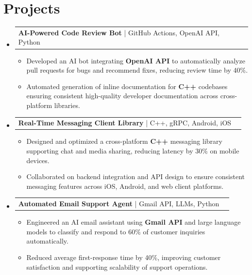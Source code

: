 \documentclass[letterpaper,11pt]{article}
\makeatletter
\newcommand{\resumeItem}[1]{
  \item\footnotesize{
    {#1 \vspace{-2pt}}
  }
}
\newcommand{\resumeProjectHeading}[2]{
    \item
    \begin{tabular*}{1.001\textwidth}{l@{\extracolsep{\fill}}r}
      \small#1 & \textbf{\small #2}\\
    \end{tabular*}\vspace{-7pt}
}
\newcommand{\resumeSubHeadingListStart}{\begin{itemize}[leftmargin=0pt, label={}]}
\newcommand{\resumeSubHeadingListEnd}{\end{itemize}}
\newcommand{\resumeItemListStart}{\begin{itemize}[leftmargin=*]}
\newcommand{\resumeItemListEnd}{\end{itemize}\vspace{-5pt}}
\makeatother
\begin{document}
\section{Projects}
    \vspace{-5pt}
    \resumeSubHeadingListStart
      \resumeProjectHeading
          {\textbf{AI-Powered Code Review Bot} | GitHub Actions, OpenAI API, Python}{}
          \resumeItemListStart
              \resumeItem{Developed an AI bot integrating \textbf{OpenAI API} to automatically analyze pull requests for bugs and recommend fixes, reducing review time by 40\%.}
              \resumeItem{Automated generation of inline documentation for \textbf{C++} codebases ensuring consistent high-quality developer documentation across cross-platform libraries.}
          \resumeItemListEnd
          \vspace{-12pt}
      \resumeProjectHeading
          {\textbf{Real-Time Messaging Client Library} | C++, gRPC, Android, iOS}{}
          \resumeItemListStart
              \resumeItem{Designed and optimized a cross-platform \textbf{C++} messaging library supporting chat and media sharing, reducing latency by 30\% on mobile devices.}
              \resumeItem{Collaborated on backend integration and API design to ensure consistent messaging features across iOS, Android, and web client platforms.}
          \resumeItemListEnd
          \vspace{-12pt}
      \resumeProjectHeading
          {\textbf{Automated Email Support Agent} | Gmail API, LLMs, Python}{}
          \resumeItemListStart
              \resumeItem{Engineered an AI email assistant using \textbf{Gmail API} and large language models to classify and respond to 60\% of customer inquiries automatically.}
              \resumeItem{Reduced average first-response time by 40\%, improving customer satisfaction and supporting scalability of support operations.}
          \resumeItemListEnd 
    \resumeSubHeadingListEnd
\end{document}
